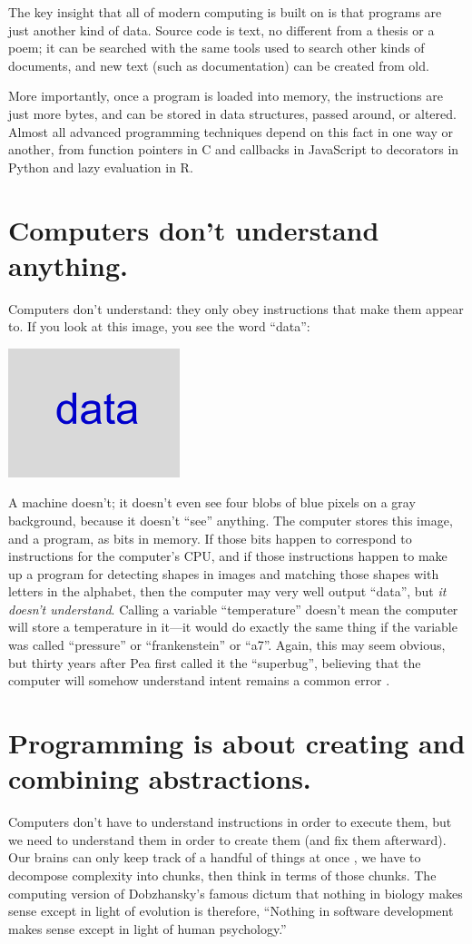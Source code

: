 \documentclass[10pt,letterpaper]{article}
\newcommand{\rulemajor}[1]{\section{#1}}
\begin{document}
The key insight that all of modern computing is built on is that programs are
just another kind of data.  Source code is text, no different from a thesis or a
poem; it can be searched with the same tools used to search other kinds of
documents, and new text (such as documentation) can be created from old.

More importantly, once a program is loaded into memory, the instructions are
just more bytes, and can be stored in data structures, passed around, or
altered.  Almost all advanced programming techniques depend on this fact in one
way or another, from function pointers in C and callbacks in JavaScript to
decorators in Python and lazy evaluation in R.

\rulemajor{Computers don't understand anything.}

Computers don't understand: they only obey instructions that make them appear
to.  If you look at this image, you see the word ``data'':

\includegraphics[width=5.0cm]{data.png}

A machine doesn't; it doesn't even see four blobs of blue pixels on a gray
background, because it doesn't ``see'' anything.  The computer stores this
image, and a program, as bits in memory.  If those bits happen to correspond to
instructions for the computer's CPU, and if those instructions happen to make up
a program for detecting shapes in images and matching those shapes with letters
in the alphabet, then the computer may very well output ``data'', but \emph{it
  doesn't understand}.  Calling a variable ``temperature'' doesn't mean the
computer will store a temperature in it---it would do exactly the same thing if
the variable was called ``pressure'' or ``frankenstein'' or ``a7''.  Again, this
may seem obvious, but thirty years after Pea first called it the ``superbug'',
believing that the computer will somehow understand intent remains a common
error \cite{Pea1986}.

\rulemajor{Programming is about creating and combining abstractions.}

Computers don't have to understand instructions in order to execute them, but we
need to understand them in order to create them (and fix them afterward).  Our
brains can only keep track of a handful of things at once \cite{Mill1956}, we
have to decompose complexity into chunks, then think in terms of those chunks.
The computing version of Dobzhansky's famous dictum that nothing in biology
makes sense except in light of evolution \cite{Dobz1973} is therefore, ``Nothing
in software development makes sense except in light of human psychology.''
\end{document}

